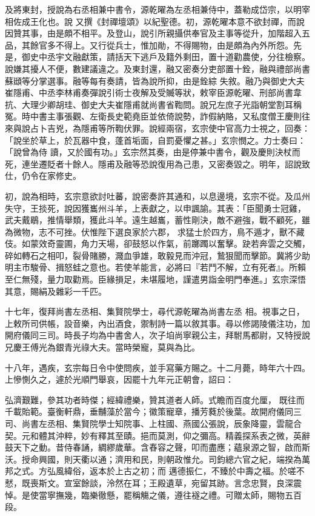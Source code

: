 \begin{pinyinscope}
 及將東封，授說為右丞相兼中書令，源乾曜為左丞相兼侍中，蓋勒成岱宗，以明宰相佐成王化也。說
 又撰《封禪壇頌》以紀聖德。初，源乾曜本意不欲封禪，而說因贊其事，由是頗不相平。及登山，說引所親攝供奉官及主事等從升，加階超入五品，其餘官多不得上。又行從兵士，惟加勛，不得賜物，由是頗為內外所怨。先是，御史中丞宇文融獻策，請括天下逃戶及籍外剩田，置十道勸農使，分往檢察。說嫌其擾人不便，數建議違之。及東封還，融又密奏分吏部置十銓，融與禮部尚書蘇頲等分掌選事。融等每有奏請，皆為說所抑，由是銓綜
 失敘。融乃與御史大夫崔隱甫、中丞李林甫奏彈說引術士夜解及受贓等狀，敕宰臣源乾曜、刑部尚書韋抗、大理少卿胡珪、御史大夫崔隱甫就尚書省鞫問。說兄左庶子光詣朝堂割耳稱冤。時中書主事張觀、左衛長史範堯臣並依倚說勢，詐假納賂，又私度僧王慶則往來與說占卜吉兇，為隱甫等所鞫伏罪。說經兩宿，玄宗使中官高力士視之，回奏：「說坐於草上，於瓦器中食，蓬首垢面，自罰憂懼之甚。」玄宗憫之。力士奏曰：「說曾為侍
 讀，又於國有功。」玄宗然其奏，由是停兼中書令，觀及慶則決杖而死，連坐遷貶者十餘人。隱甫及融等恐說復用為己患，又密奏毀之。明年，詔說致仕，仍令在家修史。



 初，說為相時，玄宗意欲討吐蕃，說密奏許其通和，以息邊境，玄宗不從。及瓜州失守，王掞死，說因獲巂州斗羊，上表獻之，以申諷諭。其表：「臣聞勇士冠雞，武夫戴鶡，推情舉類，獲此斗羊。遠生越巂，蓄性剛決，敵不避強，戰不顧死，雖為微物，志不可挫。伏惟陛下選良家於六郡，
 求猛士於四方，鳥不遁才，獸不藏伎。如蒙效奇靈圃，角力天場，卻鼓怒以作氣，前躑躅以奮擊。趹若奔雲之交觸，碎如轉石之相叩，裂骨賭勝，濺血爭雄，敢毅見而沖冠，鷙狠聞而擊節。冀將少助明主市駿骨、揖怒蛙之意也。若使羊能言，必將曰『若鬥不解，立有死者』。所賴至仁無殘，量力取勸焉。臣緣損足，未堪履地，謹遣男詣金明門奉進。」玄宗深悟其意，賜絹及雜彩一千匹。



 十七年，復拜尚書左丞相、集賢院學士，尋代源乾曜為尚書左丞
 相。視事之日，上敕所司供帳，設音樂，內出酒食，禦制詩一篇以敘其事。尋以修謁陵儀注功，加開府儀同三司。時長子均為中書舍人，次子垍尚寧親公主，拜駙馬都尉，又特授說兄慶王傅光為銀青光祿大夫。當時榮寵，莫與為比。



 十八年，遇疾，玄宗每日令中使問疾，並手寫藥方賜之。十二月薨，時年六十四。上慘惻久之，遽於光順門舉哀，因罷十九年元正朝會，詔曰：



 弘濟艱難，參其功者時傑；經緯禮樂，贊其道者人師。式瞻而百度允厘，
 既往而千載貽範。臺衡軒鼎，垂黼藻於當今；徽策寵章，播芳蕤於後葉。故開府儀同三司、尚書左丞相、集賢院學士知院事、上柱國、燕國公張說，辰象降靈，雲龍合契。元和體其沖粹，妙有釋其至賾。挹而莫測，仰之彌高。精義探系表之微，英辭鼓天下之動。昔侍春誦，綢繆歲華。含舂容之聲，叩而盡應；蘊泉源之智，啟而斯沃。授命興國，則天衢以通；濟用和民，則朝政惟允。司鈞總六官之紀，端揆為萬邦之式。方弘風緯俗，返本於上古之初；而
 邁德振仁，不臻於中壽之福。於嗟不憖，既喪斯文。宣室餘談，泠然在耳；王殿遺草，宛留其跡。言念忠賢，良深震悼。是使當寧撫幾，臨樂徹懸，罷稱觴之儀，遵往襚之禮。可贈太師，賜物五百段。




\end{pinyinscope}
